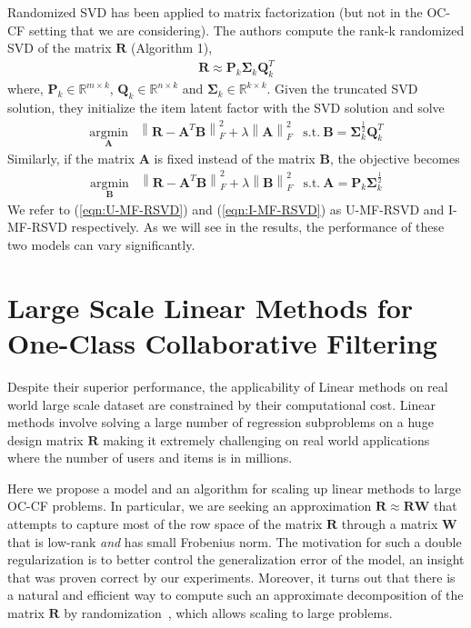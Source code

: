 \documentclass{article}
\newcommand{\citep}{\cite}
\newcommand{\R}{\mathbf{R}}
\newcommand{\A}{\mathbf{A}}
\newcommand{\B}{\mathbf{B}}
\newcommand{\Sig}{\mathbf{\Sigma}}
\renewcommand{\P}{\mathbf{P}}
\newcommand{\Q}{\mathbf{Q}}
\newcommand{\W}{\mathbf{W}}
\begin{document}
Randomized SVD has been applied to matrix factorization \citep{Tang:2013}
(but not in the OC-CF setting that we are considering).
The authors compute the rank-k randomized SVD of the matrix $\R$ (Algorithm 1),
\begin{align}
    \label{eqn:truncatedSVD}
    \R \approx \P_k \Sig_k \Q^T_k
\end{align}
where, $\P_k \in \mathbb{R}^{m \times k}$, $\Q_k \in \mathbb{R}^{n \times k}$ and $\Sig_k \in \mathbb{R}^{k \times k}$. Given the truncated SVD solution, they initialize the item latent factor with the SVD solution and solve
\begin{align} \label{eqn:I-MF-RSVD}
\underset{\A}{\mathrm{argmin}} & \left \| \R - \A^T\B\right \|_F^2 + \lambda \left \|  \A \right \|_F^2 & \text{s.t.}\  \B = \Sig_k^{\frac{1}{2}} \Q^T_k
\end{align}
Similarly, if the matrix $\A$ is fixed instead of the matrix $\B$, the objective becomes
\begin{align}
\label{eqn:U-MF-RSVD}
\underset{\B}{\mathrm{argmin}} & \left \| \R - \A^T\B\right \|_F^2 + \lambda \left \|  \B \right \|_F^2 & \text{s.t.}\  \A = \P_k \Sig_k^{\frac{1}{2}}
\end{align}
We refer to (\ref{eqn:U-MF-RSVD}) and (\ref{eqn:I-MF-RSVD}) as U-MF-RSVD and I-MF-RSVD respectively. As we will see in the results, the performance of these two models can vary significantly.


\section{Large Scale Linear Methods for One-Class Collaborative Filtering}
Despite their superior performance, the applicability of Linear methods on real world large scale dataset are constrained by their computational cost. Linear methods involve solving  a large number of regression subproblems on a huge design matrix $\R$ making it extremely challenging on real world applications where the number of users and items is in millions.

Here we propose a model and an algorithm for scaling up linear methods to large OC-CF problems.
In particular, we are seeking an approximation $\R \approx \R \W$ that attempts to capture most of the row space of the matrix $\R$ through a matrix $\W$ that is low-rank {\em and} has small Frobenius norm. The motivation for such a double regularization is to better control the generalization error of the model, an insight that was proven correct by our experiments. Moreover, it turns out that there is a natural and efficient way to compute such an approximate decomposition of the matrix $\R$ by randomization~\citep{halko2011}, which allows scaling to large problems.
\end{document}
